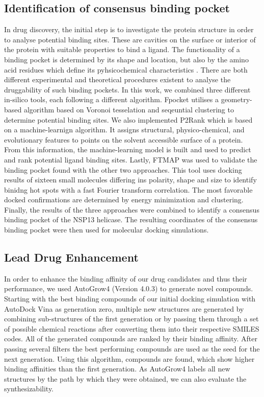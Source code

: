 \documentclass[11pt, letterpaper, titlepage]{article}
\renewcommand{\cite}{\parencite}
\begin{document}
\subsection{Identification of consensus binding pocket}
In drug discovery, the initial step is to investigate the protein structure in order to analyse potential binding sites. These are cavities on the surface or interior of the protein with suitable properties to bind a ligand. The functionality of a binding pocket is determined by its shape and location, but also by the amino acid residues which define its pyhsicochemical characteristics \cite{Stank_2016}. 
There are both different experimental and theoretical procedures existent to analyse the druggability of such binding pockets. In this work, we combined three different in-silico tools, each following a different algorithm. Fpocket \cite{package_Fpocket} utilises a geometry-based algorithm based on Voronoi tesselation and seqeuntial clustering to determine potential binding sites. We also implemented P2Rank \cite{package_P2Rank, package_PrankWeb, package_PrankWeb3} which is based on a machine-learnign algorithm. 
It assigns structural, physico-chemical, and evolutionary features to points on the solvent accessible surface of a protein. From this information, the machine-learning model is built and used to predict and rank potential ligand binding sites. Lastly, FTMAP \cite{package_FTMAP} was used to validate the binding pocket found with the other two approaches. This tool uses docking results of sixteen small molecules differing ins polarity, shape and size to identify binidng hot spots with a fast Fourier transform correlation. The most favorable docked confirmations are determined by energy minimization and clustering.
Finally, the results of the three approaches were combined to identify a consensus binding pocket of the NSP13 helicase. The resulting coordinates of the consensus binding pocket were then used for molecular docking simulations. 

\subsection{Lead Drug Enhancement}
In order to enhance the binding affinity of our drug candidates and thus their performance, we used AutoGrow4 (Version 4.0.3) \cite{package_Autogrow4} to generate novel compounds. Starting with the best binding compounds of our initial docking simulation with AutoDock Vina as generation zero, multiple new structures are generated by combining sub-structures of the first generation or by passing them through a set of possible chemical reactions after converting them into their respective SMILES codes. All of the generated compounds are ranked by their binding affinity. After passing several filters the best performing compounds are used as the seed for the next generation. Using this algorithm, compounds are found, which show higher binding affinities than the first generation. As AutoGrow4 labels all new structures by the path by which they were obtained, we can also evaluate the synthesizability.  
\end{document}

